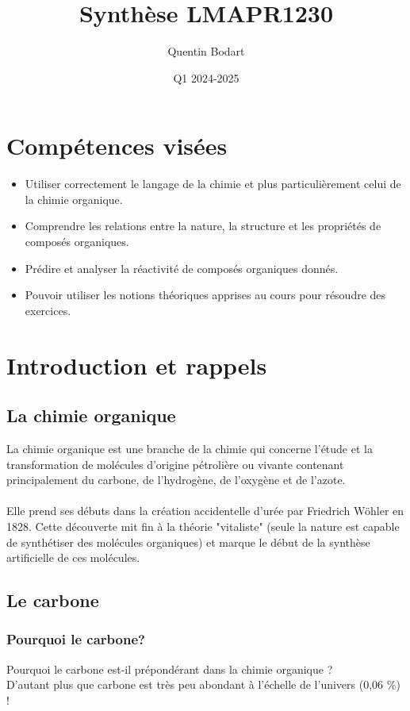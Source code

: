 \documentclass{article}
\title{Synthèse LMAPR1230}
\author{Quentin Bodart}
\date{Q1 2024-2025}
\begin{document}
\maketitle
\tableofcontents
\pagebreak

\section*{Compétences visées}
    \begin{itemize}
        \item Utiliser correctement le langage de la chimie et plus
        particulièrement celui de la chimie organique.
        \item Comprendre les relations entre la nature, la
        structure et les propriétés de composés organiques.
        \item Prédire et analyser la réactivité de composés
        organiques donnés.
        \item Pouvoir utiliser les notions théoriques apprises au
        cours pour résoudre des exercices.
    \end{itemize}

\section{Introduction et rappels}
    \subsection{La chimie organique}
        La chimie organique est une branche de la chimie qui concerne
        l’étude et la transformation de molécules d’origine pétrolière ou
        vivante contenant principalement
        du carbone, de l’hydrogène, de l’oxygène et de l’azote.\\\\
        Elle prend ses débuts dans la création accidentelle d'urée par Friedrich Wöhler en 1828.
        Cette découverte mit fin à la théorie "vitaliste" (seule la nature est capable de synthétiser des molécules organiques) 
        et marque le début de la synthèse artificielle de ces molécules.

    \subsection{Le carbone}
        \subsubsection{Pourquoi le carbone?}
            Pourquoi le carbone est-il prépondérant dans la chimie organique ? \\
            D'autant plus que carbone est très peu abondant à l'échelle de l'univers (0,06 \%) !
\end{document}
